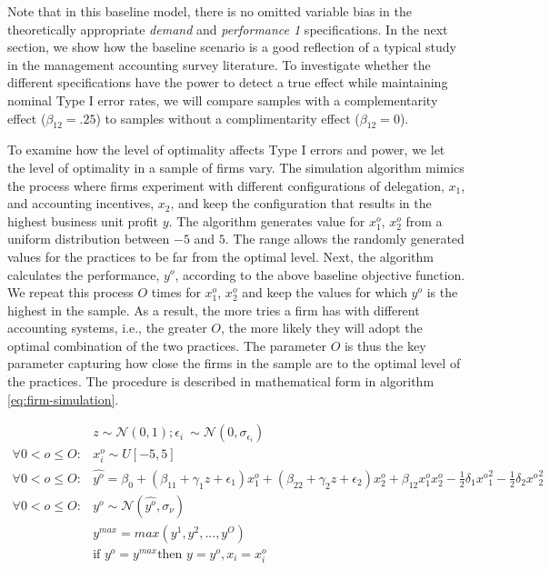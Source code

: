 \documentclass[12pt]{article}
\begin{document}
Note that in this baseline model, there is no omitted variable bias in the theoretically appropriate \emph{demand} and \emph{performance 1} specifications. In the next section, we show how the baseline scenario is a good reflection of a typical study in the management accounting survey literature. To investigate whether the different specifications have the power to detect a true effect while maintaining nominal Type I error rates, we will compare samples with a complementarity effect ($\beta_{12} = .25$) to samples without a complimentarity effect ($\beta_{12} = 0$).

To examine how the level of optimality affects Type I errors and power, we let the level of optimality in a sample of firms vary. The simulation algorithm mimics the process where firms experiment with different configurations of delegation, $x_1$,  and accounting incentives, $x_2$, and keep the configuration that results in the highest business unit profit $y$. The algorithm generates value for $x^o_{1}$, $x^o_{2}$ from a uniform distribution between $-5$ and $5$. The range allows the randomly generated values for the practices to be far from the optimal level. Next, the algorithm calculates the performance, $y^o$, according to the above baseline objective function. We repeat this process $O$ times for $x^o_{1}$, $x^o_{2}$ and keep the values for which $y^o$ is the highest in the sample. As a result, the more tries a firm has with different accounting systems, i.e., the greater $O$, the more likely they will adopt the optimal combination of the two practices. The parameter $O$ is thus the key parameter capturing how close the firms in the sample are to the optimal level of the practices. The procedure is described in mathematical form in algorithm \eqref{eq:firm-simulation}. 

\begin{equation}\label{eq:firm-simulation}
\begin{aligned}
	&z \sim \mathcal{N}(0, 1); \epsilon_i ~ \sim \mathcal{N}(0, \sigma_{\epsilon_i}) \\
    \forall 0 < o \leq O: &x^o_i \sim U[-5,5] \\
    \forall 0 < o \leq O: &\hat{y^o} = \beta_0 + (\beta_{11} + \gamma_1 z + \epsilon_1) x^o_1 
						+ (\beta_{22} + \gamma_2 z  + \epsilon_2) x^o_2 
                        + \beta_{12} x^o_1 x^o_2 - \frac{1}{2}\delta_1 {x^o}^2_1 - \frac{1}{2}\delta_2 {x^o}^2_2 \\
     \forall 0 < o \leq O: &y^o \sim \mathcal{N}(\hat{y^o}, \sigma_{\nu}) \\
	 &y^{max} = max(y^1, y^2, ..., y^O)  \\
     &\text{if } y^o = y^{max} \text{then } y = y^o, x_i = x^o_i
\end{aligned}
\end{equation}
\end{document}

